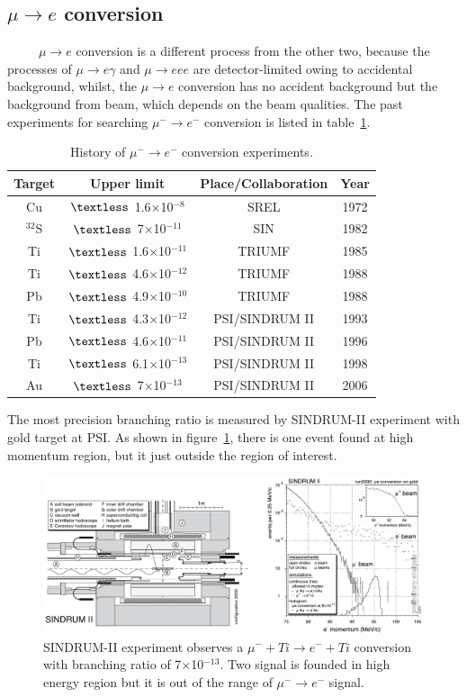 \subsection{$\mu \rightarrow e$ conversion}
~~~~~$\mu \rightarrow e$ conversion is a different process from the other two, because the processes of $\mu \rightarrow e\gamma$ and $\mu \rightarrow eee$ are detector-limited owing to accidental background, whilst, the $\mu \rightarrow e$ conversion has no accident background but the background from beam, which depends on the beam qualities.
The past experiments for searching $\mu^- \rightarrow e^-$ conversion is listed in table~\ref{muehis}.
\begin{table}[H]
 \centering
 \begin{tabular}{cccc} \hline \hline
  Target & Upper limit & Place/Collaboration & Year \\ \hline
  Cu & $\textless$ 1.6$\times$10$^{-8}$ & SREL & 1972 \\
  $^{32}$S & $\textless$ 7$\times$10$^{-11}$ & SIN & 1982 \\
  Ti & $\textless$ 1.6$\times$10$^{-11}$ & TRIUMF & 1985 \\
  Ti & $\textless$ 4.6$\times$10$^{-12}$ & TRIUMF & 1988 \\
  Pb & $\textless$ 4.9$\times$10$^{-10}$ & TRIUMF & 1988 \\
  Ti & $\textless$ 4.3$\times$10$^{-12}$ & PSI/SINDRUM II & 1993 \\
  Pb & $\textless$ 4.6$\times$10$^{-11}$ & PSI/SINDRUM II & 1996 \\
  Ti & $\textless$ 6.1$\times$10$^{-13}$ & PSI/SINDRUM II & 1998 \\
  Au & $\textless$ 7$\times$10$^{-13}$ & PSI/SINDRUM II & 2006 \\ \hline \hline
 \end{tabular}
 \caption{History of $\mu^- \rightarrow e^-$ conversion experiments.}
 \label{muehis}
\end{table}
The most precision branching ratio is measured by SINDRUM-II experiment with gold target at PSI.
As shown in figure~\ref{sind}, there is one event found at high momentum region, but it just outside the region of interest.
\begin{figure}[H]
 \centering
 \includegraphics[scale=0.5]{chapter1/fig/sindrum.pdf}
 \caption{SINDRUM-II experiment observes a $\mu^- + Ti \rightarrow e^- + Ti$ conversion with branching ratio of 7$\times$10$^{-13}$. Two signal is founded in high energy region but it is out of the range of $\mu^- \rightarrow e^-$ signal.}
 \label{sind}
\end{figure}
